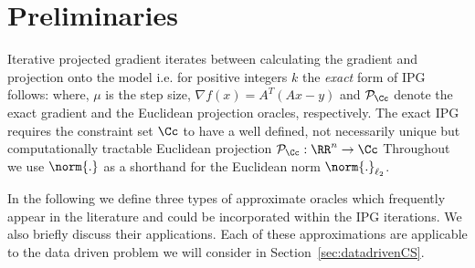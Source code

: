 \section{Preliminaries}\label{sec:prelim}
Iterative projected gradient iterates between calculating the gradient and projection onto the model 
i.e. for positive integers $k$ the \emph{exact} form of IPG follows:
where, $\mu$ is the step size, $\nabla f(x)=A^T(Ax-y)$ and $\pp_\Cc$ denote the exact gradient and the Euclidean projection oracles, respectively.  
The exact IPG requires   
the constraint set $\Cc$ 
to have a well defined, not necessarily unique but  computationally tractable Euclidean projection $\pp_{\Cc}:\RR^n\rightarrow \Cc$ 
Throughout we use $\norm{.}$ as a shorthand for  the Euclidean norm $\norm{.}_{\ell_2}$. 

In the following we define three types of approximate oracles which frequently appear in the literature and could be incorporated within the IPG iterations. We also briefly discuss their applications. Each of these approximations are applicable to the data driven problem we will consider in Section~\ref{sec:datadrivenCS}.
